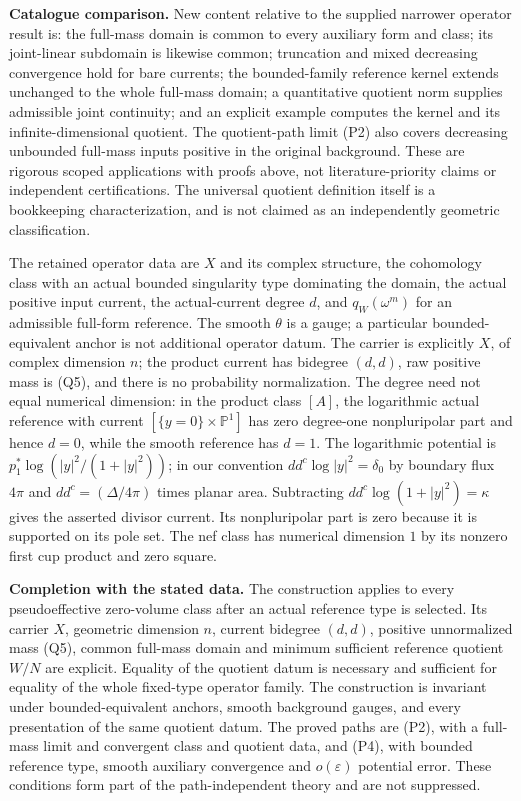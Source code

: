 \documentclass[
  11pt,
]{article}
\begin{document}
\textbf{Catalogue comparison.} New content relative to the supplied
narrower operator result is: the full-mass domain is common to every
auxiliary form and class; its joint-linear subdomain is likewise common;
truncation and mixed decreasing convergence hold for bare currents; the
bounded-family reference kernel extends unchanged to the whole full-mass
domain; a quantitative quotient norm supplies admissible joint
continuity; and an explicit example computes the kernel and its
infinite-dimensional quotient. The quotient-path limit (P2) also covers
decreasing unbounded full-mass inputs positive in the original
background. These are rigorous scoped applications with proofs above,
not literature-priority claims or independent certifications. The
universal quotient definition itself is a bookkeeping characterization,
and is not claimed as an independently geometric classification.

The retained operator data are \(X\) and its complex structure, the
cohomology class with an actual bounded singularity type dominating the
domain, the actual positive input current, the actual-current degree
\(d\), and \(q_W(\omega^m)\) for an admissible full-form reference. The
smooth \(\theta\) is a gauge; a particular bounded-equivalent anchor is
not additional operator datum. The carrier is explicitly \(X\), of
complex dimension \(n\); the product current has bidegree \((d,d)\), raw
positive mass is (Q5), and there is no probability normalization. The
degree need not equal numerical dimension: in the product class \([A]\),
the logarithmic actual reference with current
\([\{y=0\}\times\mathbb P^1]\) has zero degree-one nonpluripolar part
and hence \(d=0\), while the smooth reference has \(d=1\). The
logarithmic potential is \(p_1^*\log(|y|^2/(1+|y|^2))\); in our
convention \(dd^c\log|y|^2=\delta_0\) by boundary flux \(4\pi\) and
\(dd^c=(\Delta/4\pi)\) times planar area. Subtracting
\(dd^c\log(1+|y|^2)=\kappa\) gives the asserted divisor current. Its
nonpluripolar part is zero because it is supported on its pole set. The
nef class has numerical dimension \(1\) by its nonzero first cup product
and zero square.

\textbf{Completion with the stated data.} The construction applies to
every pseudoeffective zero-volume class after an actual reference type
is selected. Its carrier \(X\), geometric dimension \(n\), current
bidegree \((d,d)\), positive unnormalized mass (Q5), common full-mass
domain and minimum sufficient reference quotient \(W/N\) are explicit.
Equality of the quotient datum is necessary and sufficient for equality
of the whole fixed-type operator family. The construction is invariant
under bounded-equivalent anchors, smooth background gauges, and every
presentation of the same quotient datum. The proved paths are (P2),
with a full-mass limit and convergent class and quotient data, and (P4),
with bounded reference type, smooth auxiliary convergence and
\(o(\varepsilon)\) potential error. These conditions form part of the
path-independent theory and are not suppressed.
\end{document}
